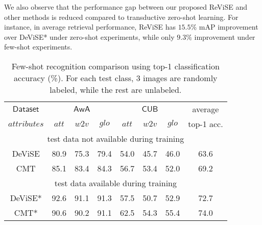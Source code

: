 {{We also observe that the performance gap between our proposed ReViSE and other methods is reduced compared to transductive zero-shot learning. For instance, in average retrieval performance, ReViSE has $15.5\%$ mAP improvement over DeViSE* under zero-shot experiments, while only $9.3\%$ improvement under few-shot experiments.  


\begin{table}[t!]
\centering
\caption{\footnotesize Few-shot recognition comparison using top-1 classification accuracy (\%). For each test class, 3 images are randomly labeled, while the rest are unlabeled.}
\vspace{1mm}
\scalebox{0.72}
{
\begin{tabular}{|c||lll||lll||c|}
\hline
$\mathsf{Dataset}$ & \multicolumn{3}{c||}{$\mathsf{AwA}$}                                                      & \multicolumn{3}{c||}{$\mathsf{CUB}$}                                                     & average                          \\
                    $\textit{attributes}$    & \multicolumn{1}{c}{$\textit{att}$} & \multicolumn{1}{c}{$\textit{w2v}$} & \multicolumn{1}{c||}{$\textit{glo}$} & \multicolumn{1}{c}{$\textit{att}$} & \multicolumn{1}{c}{$\textit{w2v}$} & \multicolumn{1}{c||}{$\textit{glo}$} & top-1 acc. \\  \hline \hline
\multicolumn{8}{|c|}{test data not available during training}                                                                                                                                                                                        \\ \hline \hline
DeViSE \cite{frome2013devise}     &   80.9     &   75.3 &  79.4  & 54.0  &      45.7  &  46.0   &  63.6 \\
CMT \cite{socher2013zero}    &  85.1  &    83.4    &  84.3   &    56.7     &    53.4   &    52.0   & 69.2  \\ \hline \hline
\multicolumn{8}{|c|}{test data available during training}                                                                                                                                                                                        \\ \hline \hline
DeViSE* \cite{frome2013devise}     &    92.6      &      91.1  &   91.3     &   57.5     &      50.7   &   52.9       &    72.7   \\
CMT* \cite{socher2013zero}    &  90.6  &    90.2    &  91.1   &    62.5     &    54.3   &    55.4   &  74.0    \\

\end{tabular}}
\end{table}}}
